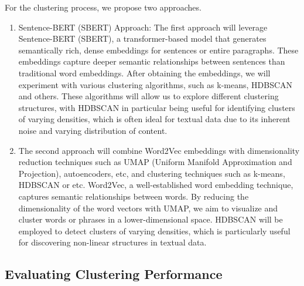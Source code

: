 \documentclass[11pt]{article}
\begin{document}
For the clustering process, we propose two approaches. 
\begin{enumerate}
    \item Sentence-BERT (SBERT) Approach:
    The first approach will leverage Sentence-BERT (SBERT), a transformer-based model that generates semantically rich, dense embeddings for sentences or entire paragraphs. These embeddings capture deeper semantic relationships between sentences than traditional word embeddings. After obtaining the embeddings, we will experiment with various clustering algorithms, such as k-means, HDBSCAN and others. These algorithms will allow us to explore different clustering structures, with HDBSCAN in particular being useful for identifying clusters of varying densities, which is often ideal for textual data due to its inherent noise and varying distribution of content.

    \item The second approach will combine Word2Vec embeddings with dimensionality reduction techniques such as UMAP (Uniform Manifold Approximation and Projection), autoencoders, etc, and clustering techniques such as k-means, HDBSCAN or etc. Word2Vec, a well-established word embedding technique, captures semantic relationships between words. By reducing the dimensionality of the word vectors with UMAP, we aim to visualize and cluster words or phrases in a lower-dimensional space. HDBSCAN will be employed to detect clusters of varying densities, which is particularly useful for discovering non-linear structures in textual data.
\end{enumerate}

\subsection{Evaluating Clustering Performance}
\end{document}
